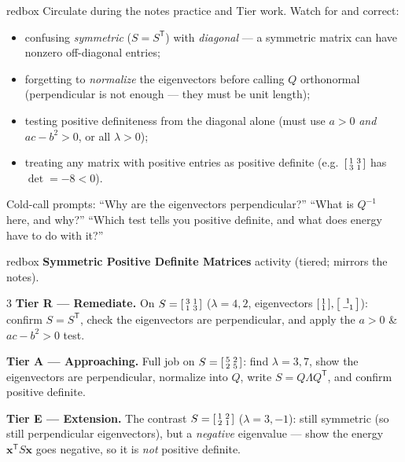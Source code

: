 \documentclass[10pt]{article}
\newcommand{\xx}{\mathbf{x}}
\newcommand{\T}{\mathsf{T}}
\begin{document}
\begin{skillbox}{redbox}
Circulate during the notes practice and Tier work. Watch for and correct:
\begin{itemize}[leftmargin=1.2em, nosep]
  \item confusing \emph{symmetric} ($S=S^{\T}$) with \emph{diagonal} --- a symmetric matrix can have nonzero off-diagonal entries;
  \item forgetting to \emph{normalize} the eigenvectors before calling $Q$ orthonormal (perpendicular is not enough --- they must be unit length);
  \item testing positive definiteness from the diagonal alone (must use $a>0$ \emph{and} $ac-b^2>0$, or all $\lambda>0$);
  \item treating any matrix with positive entries as positive definite (e.g.\ $\begin{bsmallmatrix}1&3\\3&1\end{bsmallmatrix}$ has $\det=-8<0$).
\end{itemize}
Cold-call prompts: ``Why are the eigenvectors perpendicular?'' ``What is $Q^{-1}$ here, and why?'' ``Which
test tells you positive definite, and what does energy have to do with it?''
\end{skillbox}

\begin{skillbox}{redbox}
\textbf{Symmetric Positive Definite Matrices} activity (tiered; mirrors the notes).
\begin{multicols}{3}
\textbf{Tier R --- Remediate.} On $S=\begin{bsmallmatrix}3&1\\1&3\end{bsmallmatrix}$ ($\lambda=4,2$, eigenvectors
$\begin{bsmallmatrix}1\\1\end{bsmallmatrix},\begin{bsmallmatrix}1\\-1\end{bsmallmatrix}$): confirm $S=S^{\T}$,
check the eigenvectors are perpendicular, and apply the $a>0$ \& $ac-b^2>0$ test.

\columnbreak
\textbf{Tier A --- Approaching.} Full job on $S=\begin{bsmallmatrix}5&2\\2&5\end{bsmallmatrix}$: find
$\lambda=3,7$, show the eigenvectors are perpendicular, normalize into $Q$, write $S=Q\Lambda Q^{\T}$, and
confirm positive definite.

\columnbreak
\textbf{Tier E --- Extension.} The contrast $S=\begin{bsmallmatrix}1&2\\2&1\end{bsmallmatrix}$ ($\lambda=3,-1$):
still symmetric (so still perpendicular eigenvectors), but a \emph{negative} eigenvalue --- show the energy
$\xx^{\T}S\xx$ goes negative, so it is \emph{not} positive definite.
\end{multicols}
\end{skillbox}
\end{document}
